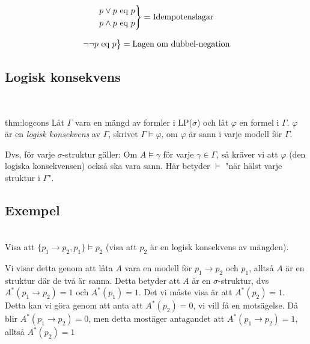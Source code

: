 \begin{equation*}
  \begin{gathered}
    \begin{rcases*}
      p\vee p \text{ eq } p\\
      p\wedge p \text{ eq } p
    \end{rcases*}=\text{Idempotenslagar}
  \end{gathered}
\end{equation*}
\par\bigskip

\begin{equation*}
  \begin{gathered}
    \begin{rcases*}
      \neg\neg p \text{ eq } p
    \end{rcases*}=\text{Lagen om dubbel-negation}
  \end{gathered}
\end{equation*}
\par\bigskip

\subsection{Logisk konsekvens}\hfill\\

\begin{theo}{thm:logcons}
  Låt $\Gamma$ vara en mängd av formler i LP($\sigma$) och låt $\varphi$ en formel i $\Gamma$. $\varphi$ är en \textit{logisk konsekvens} av $\Gamma$, skrivet $\Gamma\vDash\varphi$, om $\varphi$ är sann i varje modell för $\Gamma$.
  \par\bigskip
  \noindent Dvs, för varje $\sigma$-struktur gäller: Om $A\vDash\gamma$ för varje $\gamma\in\Gamma$, så kräver vi att $\varphi$ (den logiska konsekvensen) också ska vara sann. Här betyder $\vDash$ "när hälst varje struktur i $\Gamma$".
\end{theo}

\subsection{Exempel}\hfill\\
\noindent Visa att $\{p_1\rightarrow p_2, p_1\}\vDash p_2$ (visa att $p_2$ är en logisk konsekvens av mängden).
\par\bigskip
\noindent Vi visar detta genom att låta $A$ vara en modell för $p_1\rightarrow p_2$ och $p_1$, alltså $A$ är en struktur där de två är sanna. Detta betyder att $A$ är en $\sigma$-struktur, dvs $A^*(p_1\rightarrow p_2)=1$ och $A^*(p_1)=1$. Det vi måste visa är att $A^*(p_2)=1$. Detta kan vi göra genom att anta att $A^*(p_2)=0$, vi vill få en motsägelse. Då blir $A^*(p_1\rightarrow p_2)=0$, men detta mostäger antagandet att $A^*(p_1\rightarrow p_2)=1$, alltså $A^*(p_2)=1$
\par\bigskip

